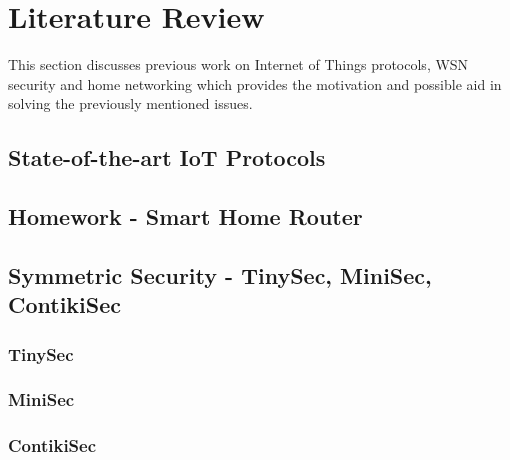 \documentclass{mprop}
\begin{document}

\section{Literature Review}
This section discusses previous work on Internet of Things protocols, WSN security and home networking which provides the motivation and possible aid in solving the previously mentioned issues.

\subsection{State-of-the-art IoT Protocols} %
\label{sub:state_of_the_art_iot_protocols}


\subsection{Homework - Smart Home Router} %
\label{sub:homework_smart_home_router}


\subsection{Symmetric Security - TinySec, MiniSec, ContikiSec} %
\label{sub:tinysec_minisec_contikisec}

\subsubsection{TinySec} %
\label{ssub:tinysec}


\subsubsection{MiniSec} %
\label{ssub:minisec}


\subsubsection{ContikiSec} %
\label{ssub:contikisec}

\cite{TinySec, luk2007minisec, ContikiSec}
\end{document}
